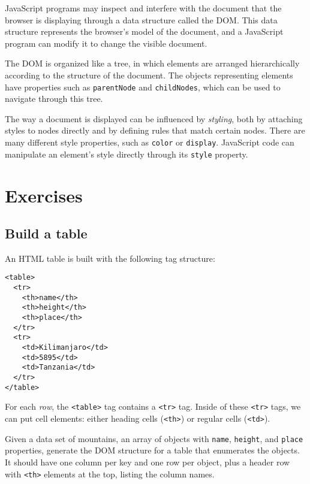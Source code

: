 JavaScript programs may inspect and interfere with the document that the browser is displaying through a data structure called the DOM. This data structure represents the browser's model of the document, and a JavaScript program can modify it to change the visible document.

The DOM is organized like a tree, in which elements are arranged hierarchically according to the structure of the document. The objects representing elements have properties such as \lstinline`parentNode` and \lstinline`childNodes`, which can be used to navigate through this tree.

The way a document is displayed can be influenced by \emph{styling}, both by attaching styles to nodes directly and by defining rules that match certain nodes. There are many different style properties, such as \lstinline`color` or \lstinline`display`. JavaScript code can manipulate an element's style directly through its \lstinline`style` property.

\section{Exercises}

\label{dom.exercise_table}\subsection{Build a table}

An HTML table is built with the following tag structure:

\begin{lstlisting}
<table>
  <tr>
    <th>name</th>
    <th>height</th>
    <th>place</th>
  </tr>
  <tr>
    <td>Kilimanjaro</td>
    <td>5895</td>
    <td>Tanzania</td>
  </tr>
</table>
\end{lstlisting}
\noindent{}

For each \emph{row}, the \lstinline`<table>` tag contains a \lstinline`<tr>` tag. Inside of these \lstinline`<tr>` tags, we can put cell elements: either heading cells (\lstinline`<th>`) or regular cells (\lstinline`<td>`).

Given a data set of mountains, an array of objects with \lstinline`name`, \lstinline`height`, and \lstinline`place` properties, generate the DOM structure for a table that enumerates the objects. It should have one column per key and one row per object, plus a header row with \lstinline`<th>` elements at the top, listing the column names.


